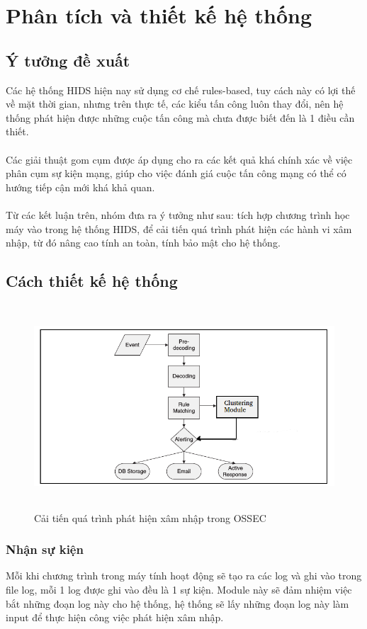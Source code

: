 \chapter{Phân tích và thiết kế hệ thống}
\section{Ý tưởng đề xuất}
Các hệ thống HIDS hiện nay sử dụng cơ chế rules-based, tuy cách này
  có lợi thế về mặt thời gian, nhưng trên thực tế, các kiểu tấn công luôn thay đổi, nên
  hệ thống phát hiện được những cuộc tấn công mà chưa được biết đến là 1 điều
  cần thiết.\\\\ 
Các giải thuật gom cụm được áp dụng cho ra các kết quả khá chính xác về
  việc phân cụm sự kiện mạng, giúp cho việc đánh giá cuộc tấn công mạng có
  thể có hướng tiếp cận mới khá khả quan.\\\\ 
Từ các kết luận trên, nhóm đưa ra ý tưởng như sau: tích hợp chương trình
học máy vào trong hệ thống HIDS, để cải tiến quá trình phát hiện các hành vi
xâm nhập, từ đó nâng cao tính an toàn, tính bảo mật cho hệ thống. 
\section{Cách thiết kế hệ thống}
 \begin{figure}[h!]
	\centering 
	\includegraphics[width=6in,height=3in,keepaspectratio=true]{eventFlowE.png}
	\caption{Cải tiến quá trình phát hiện xâm nhập trong OSSEC}
  \end{figure}
  \subsection{Nhận sự kiện}
  Mỗi khi chương trình trong máy tính hoạt động sẽ tạo ra các log và ghi vào
  trong file log, mỗi 1 log được ghi vào đều là 1 sự kiện. Module này sẽ đảm
  nhiệm việc bắt những đoạn log này cho hệ thống, hệ thống sẽ lấy những đoạn
  log này làm input để thực hiện công việc phát hiện xâm nhập.
